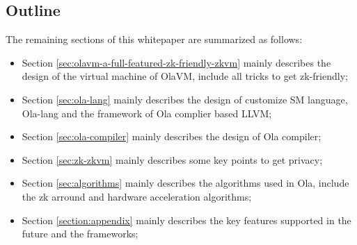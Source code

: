 \subsection{Outline}

The remaining sections of this whitepaper are summarized as follows:
\begin{itemize}
    \item Section \ref{sec:olavm-a-full-featured-zk-friendly-zkvm} mainly describes the design of the virtual machine of OlaVM, include all tricks to get zk-friendly;
    \item Section \ref{sec:ola-lang} mainly describes the design of customize SM language, Ola-lang and the framework of Ola complier based LLVM;
    \item Section \ref{sec:ola-compiler} mainly describes the design of Ola compiler;
    \item Section \ref{sec:zk-zkvm} mainly describes some key points to get privacy;
    \item Section \ref{sec:algorithms} mainly describes the algorithms used in Ola, include the zk arround and hardware acceleration algorithms;
    \item Section \ref{section:appendix} mainly describes the key features supported in the future and the frameworks;
\end{itemize}